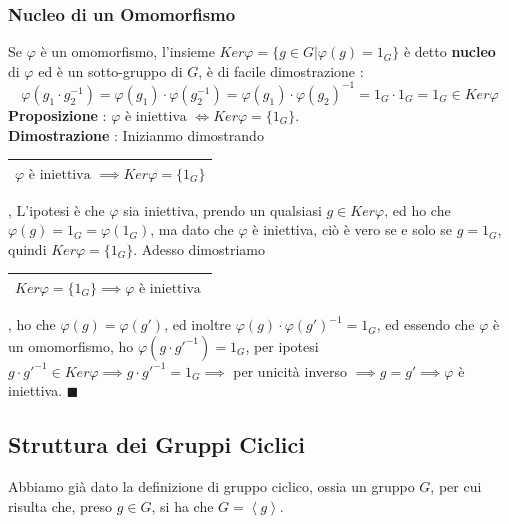 \documentclass[12pt, letterpaper]{article}
\begin{document}
\subsubsection{Nucleo di un Omomorfismo}
Se \(\varphi\) è un omomorfismo, l'insieme \(Ker\varphi=\{g\in G|\varphi(g)=1_G\}\) è detto \textbf{nucleo} di 
\(\varphi\) ed è un sotto-gruppo di \(G\), è di facile dimostrazione : 
\begin{equation}
    \varphi(g_1\cdot g_2^{-1})=\varphi(g_1)\cdot\varphi(g_2^{-1})=\varphi(g_1)\cdot\varphi(g_2)^{-1}
    =1_G\cdot 1_G = 1_G \in Ker\varphi
\end{equation}
\textbf{Proposizione }: \(\varphi\text{ è iniettiva }\iff Ker\varphi=\{1_G\}\).\\
\textbf{Dimostrazione }: Inizianmo dimostrando 
\begin{tabular}{|c|}
    \hline
    \(\varphi\text{ è iniettiva }\implies Ker\varphi=\{1_G\}\) \\ \hline
    \end{tabular}
, 
L'ipotesi è che \(\varphi\) sia iniettiva, prendo un qualsiasi \(g\in Ker\varphi\), ed ho che 
\(\varphi(g)=1_G=\varphi(1_G)\), ma dato che \(\varphi\) è iniettiva, ciò è vero se e 
solo se \(g=1_G\), quindi \(Ker\varphi=\{1_G\}\). Adesso 
dimostriamo \begin{tabular}{|c|}
    \hline
    \(Ker\varphi=\{1_G\}\implies \varphi\text{ è iniettiva }\) \\ \hline
    \end{tabular}, ho che \(\varphi(g)=\varphi(g')\), ed inoltre 
    \(\varphi(g)\cdot \varphi(g')^{-1}=1_G\), ed essendo che \(\varphi\) è un 
    omomorfismo, ho  \(\varphi(g\cdot g'^{-1})=1_G\), per ipotesi \(g\cdot g'^{-1}\in Ker\varphi
    \implies g\cdot g'^{-1}=1_G\implies\) per unicità inverso \(\implies g=g'\implies \varphi\) è iniettiva. \(\blacksquare\)
\subsection{Struttura dei Gruppi Ciclici}    
Abbiamo già dato la definizione di gruppo ciclico, ossia un gruppo \(G\), per cui risulta che,
preso \(g\in G\), si ha che \(G=\left\langle g\right\rangle\).\\
\end{document}
